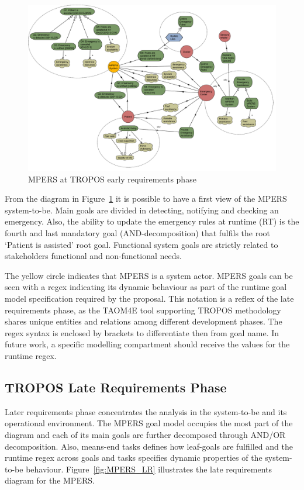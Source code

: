 \begin{figure}[ht]
\centering
\includegraphics[width=1\textwidth]{imgs/MPERS_ER.png}
\caption{MPERS at TROPOS early requirements phase}
\label{fig:MPERS_ER}
\end{figure}

From the diagram in Figure~\ref{fig:MPERS_ER} it is possible to have a first view of the MPERS system-to-be. Main goals are divided in detecting, notifying and checking an emergency. Also, the ability to update the emergency rules at runtime (RT) is the fourth and last mandatory goal (AND-decomposition) that fulfils the root `Patient is assisted' root goal. Functional system goals are strictly related to stakeholders functional and non-functional needs.

The yellow circle indicates that MPERS is a system actor. MPERS goals can be seen with a regex indicating its dynamic behaviour as part of the runtime goal model specification required by the proposal. This notation is a reflex of the late requirements phase, as the TAOM4E tool supporting TROPOS methodology shares unique entities and relations among different development phases. The regex syntax is enclosed by brackets to differentiate then from goal name. In future work, a specific modelling compartment should receive the values for the runtime regex.

\subsection{TROPOS Late Requirements Phase}

Later requirements phase concentrates the analysis in the system-to-be and its operational environment. The MPERS goal model occupies the most part of the diagram and each of its main goals are further decomposed through AND/OR decomposition. Also, means-end tasks defines how leaf-goals are fulfilled and the runtime regex across goals and tasks specifies dynamic properties of the system-to-be behaviour. Figure~\ref{fig:MPERS_LR} illustrates the late requirements diagram for the MPERS.


